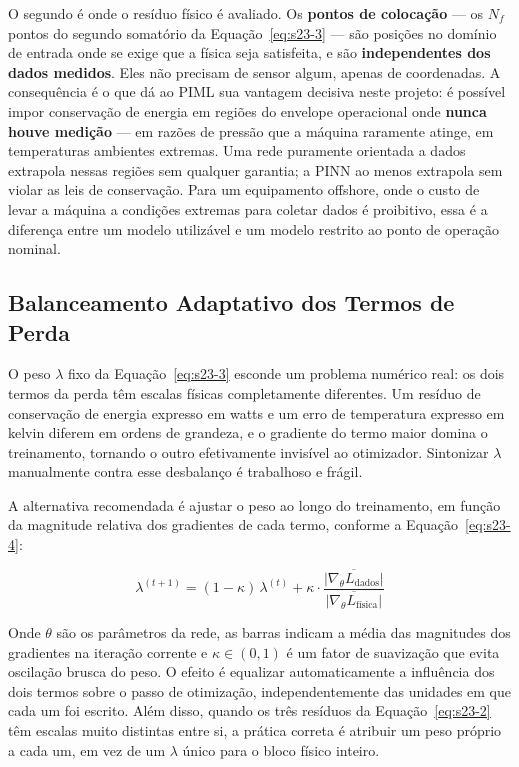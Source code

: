 \documentclass[12pt,a4paper]{article}
\numberwithin{equation}{section}
\numberwithin{table}{section}
\numberwithin{figure}{section}
\begin{document}
	O segundo é onde o resíduo físico é avaliado. Os \textbf{pontos de colocação} — os $N_f$ pontos do segundo somatório da Equação~\eqref{eq:s23-3} — são posições no domínio de entrada onde se exige que a física seja satisfeita, e são \textbf{independentes dos dados medidos}. Eles não precisam de sensor algum, apenas de coordenadas. A consequência é o que dá ao PIML sua vantagem decisiva neste projeto: é possível impor conservação de energia em regiões do envelope operacional onde \textbf{nunca houve medição} — em razões de pressão que a máquina raramente atinge, em temperaturas ambientes extremas. Uma rede puramente orientada a dados extrapola nessas regiões sem qualquer garantia; a PINN ao menos extrapola sem violar as leis de conservação. Para um equipamento offshore, onde o custo de levar a máquina a condições extremas para coletar dados é proibitivo, essa é a diferença entre um modelo utilizável e um modelo restrito ao ponto de operação nominal.

	\subsection{Balanceamento Adaptativo dos Termos de Perda}

	O peso $\lambda$ fixo da Equação~\eqref{eq:s23-3} esconde um problema numérico real: os dois termos da perda têm escalas físicas completamente diferentes. Um resíduo de conservação de energia expresso em watts e um erro de temperatura expresso em kelvin diferem em ordens de grandeza, e o gradiente do termo maior domina o treinamento, tornando o outro efetivamente invisível ao otimizador. Sintonizar $\lambda$ manualmente contra esse desbalanço é trabalhoso e frágil.

	A alternativa recomendada é ajustar o peso ao longo do treinamento, em função da magnitude relativa dos gradientes de cada termo, conforme a Equação~\eqref{eq:s23-4}:

	\begin{equation}\label{eq:s23-4}
	\lambda^{(t+1)} = (1-\kappa)\,\lambda^{(t)} + \kappa \cdot \frac{\overline{\left| \nabla_\theta L_{\text{dados}} \right|}}{\overline{\left| \nabla_\theta L_{\text{física}} \right|}}
\end{equation}

	Onde $\theta$ são os parâmetros da rede, as barras indicam a média das magnitudes dos gradientes na iteração corrente e $\kappa \in (0,1)$ é um fator de suavização que evita oscilação brusca do peso. O efeito é equalizar automaticamente a influência dos dois termos sobre o passo de otimização, independentemente das unidades em que cada um foi escrito. Além disso, quando os três resíduos da Equação~\eqref{eq:s23-2} têm escalas muito distintas entre si, a prática correta é atribuir um peso próprio a cada um, em vez de um $\lambda$ único para o bloco físico inteiro.
\end{document}
